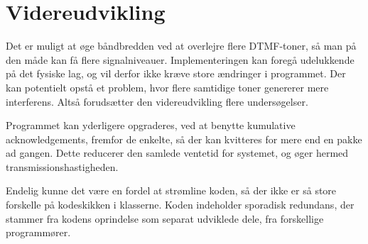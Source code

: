 \section{Videreudvikling}

Det er muligt at øge båndbredden ved at overlejre flere DTMF-toner, så man på den måde kan få flere signalniveauer. Implementeringen kan foregå udelukkende på det fysiske lag, og vil derfor ikke kræve store ændringer i programmet. Der kan potentielt opstå et problem, hvor flere samtidige toner genererer mere interferens. Altså forudsætter den videreudvikling flere undersøgelser.

Programmet kan yderligere opgraderes, ved at benytte kumulative acknowledgements, fremfor de enkelte, så der kan kvitteres for mere end en pakke ad gangen. Dette reducerer den samlede ventetid for systemet, og øger hermed transmissionshastigheden.

Endelig kunne det være en fordel at strømline koden, så der ikke er så store forskelle på kodeskikken i klasserne. Koden indeholder sporadisk redundans, der stammer fra kodens oprindelse som separat udviklede dele, fra forskellige programmører.  